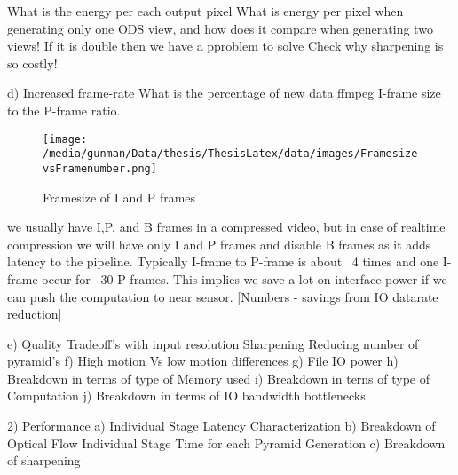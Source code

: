 What is the energy per each output pixel	
What is energy per pixel when generating only one ODS view, and how does it compare when generating two views! If it is double then we have a pproblem to solve	
Check why sharpening is so costly!	

d) Increased frame-rate\newline
		What is the percentage of new data
			ffmpeg I-frame size to the P-frame ratio.
			\begin{figure*}
				\begin{center}
					\texttt{[image: /media/gunman/Data/thesis/ThesisLatex/data/images/FramesizevsFramenumber.png]}
					\caption{Framesize of I and P frames}
					\label{fig:ex_4_9}
				\end{center}
				\vspace{-0.3in}
			\end{figure*} 
		we usually have I,P, and B frames in a compressed video, but in case of realtime compression we will have only I and P frames and disable B frames as it adds latency to the pipeline. Typically I-frame to P-frame is about ~4 times and one I-frame occur for ~30 P-frames. This implies we save a lot on interface power if we can push the computation to near sensor.  
		[Numbers - savings from IO datarate reduction]
			
	e) Quality Tradeoff's with input resolution\newline
			Sharpening
			Reducing number of pyramid's
	f) High motion Vs low motion differences
	g) File IO power
	h) Breakdown in terms of type of Memory	used
	i) Breakdown in terns of type of Computation
	j) Breakdown in terms of IO bandwidth bottlenecks
	
	

2) Performance \newline
	a) Individual Stage Latency Characterization
	b) Breakdown of Optical Flow
		Individual Stage
		Time for each Pyramid Generation
	c) Breakdown of sharpening
	

